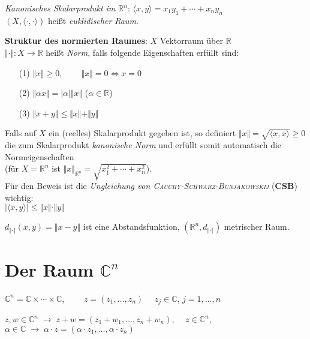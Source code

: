 \emph{Kanonisches Skalarprodukt im $\mathbb{R}^n$}:
$\langle x, y \rangle = x_1 y_1 + \cdots + x_n y_n$ \\
$(X, \langle \cdot, \cdot \rangle)$ heißt \emph{euklidischer Raum}.

\linie

\textbf{Struktur des normierten Raumes}:
$X$ Vektorraum über $\mathbb{R}$ \\
$\Vert \cdot \Vert: X \rightarrow \mathbb{R}$ heißt \emph{Norm}, falls
folgende Eigenschaften erfüllt sind:

\begin{itemize}
    \item[(1)] $\Vert x \Vert \ge 0$,
    $\qquad \Vert x \Vert = 0 \Leftrightarrow x = 0$

    \item[(2)] $\Vert \alpha x \Vert = |\alpha| \Vert x \Vert$
    \qquad ($\alpha \in \mathbb{R}$)

    \item[(3)] $\Vert x + y \Vert \le \Vert x \Vert + \Vert y \Vert$
\end{itemize}

Falls auf $X$ ein (reelles) Skalarprodukt gegeben ist, so definiert
$\Vert x \Vert = \sqrt{\langle x, x \rangle} \ge 0$ die zum Skalarprodukt
\emph{kanonische Norm} und erfüllt somit automatisch die Normeigenschaften \\
(für $X = \mathbb{R}^n$ ist $\Vert x \Vert_{\mathbb{R}^n} =
\sqrt{x_1^2 + \cdots + x_n^2}$). \\
Für den Beweis ist die \emph{Ungleichung von
\textsc{Cauchy}-\textsc{Schwarz}-\textsc{Bunjakowskij}} (\textbf{CSB})
wichtig: \\
$|\langle x, y \rangle| \le \Vert x \Vert \cdot \Vert y \Vert$

$d_{\Vert \cdot \Vert}(x,y) = \Vert x - y \Vert$ ist eine Abstandsfunktion,
$(\mathbb{R}^n, d_{\Vert \cdot \Vert})$ metrischer Raum.

\section{%
    \texorpdfstring{Der Raum $\mathbb{C}^n$}{Der Raum ℂⁿ}%
}

$\mathbb{C}^n = \mathbb{C} \times \cdots \times \mathbb{C}$,
$\qquad z = (z_1, \ldots, z_n) \quad$ $z_j \in \mathbb{C}$,
$j = 1, \ldots, n$

$z, w \in \mathbb{C}^n \;\rightarrow\; z + w = (z_1 + w_1, \ldots, z_n + w_n)$,
$\quad z \in \mathbb{C}^n$, $\alpha \in \mathbb{C} \;\rightarrow\;
\alpha \cdot z = (\alpha \cdot z_1, \ldots, \alpha \cdot z_n)$

